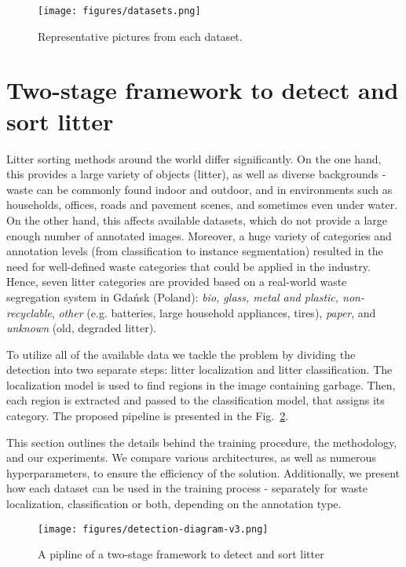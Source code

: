 \documentclass{article}
\begin{document}
\begin{figure}[!hbt]
\centering
  \texttt{[image: figures/datasets.png]}\caption{Representative pictures from each dataset. \label{fig.dataset_representants}}
\end{figure} 
\section{Two-stage framework to detect and sort litter}
\label{sec:our_approach}
Litter sorting methods around the world differ significantly. On the one hand, this provides a large variety of objects (litter), as well as diverse backgrounds - waste can be commonly found indoor and outdoor, and in environments such as households, offices, roads and pavement scenes, and sometimes even under water. On the other hand, this affects available datasets, which do not provide a large enough number of annotated images. Moreover, a huge variety of categories and annotation levels (from classification to instance segmentation) resulted in the need for well-defined waste categories that could be applied in the industry. Hence, seven litter categories are provided based on a real-world waste segregation system in Gdańsk (Poland):  \textit{bio, glass, metal and plastic, non-recyclable}, \textit{other} (e.g. batteries, large household appliances, tires), \textit{paper}, and \textit{unknown} (old, degraded litter).

To utilize all of the available data we tackle the problem by dividing the detection into two separate steps: litter localization and litter classification. The localization model is used to find regions in the image containing garbage. Then, each region is extracted and passed to the classification model, that assigns its category. The proposed pipeline is presented in the Fig.~\ref{fig.idea2}.

This section outlines the details behind the training procedure, the methodology, and our experiments. We compare various architectures, as well as numerous hyperparameters, to ensure the efficiency of the solution. Additionally, we present how each dataset can be used in the training process - separately for waste localization, classification or both, depending on the annotation type.

\begin{figure}[!ht]
\centering
  \texttt{[image: figures/detection-diagram-v3.png]}\caption{A pipline of a two-stage framework to detect and sort litter\label{fig.idea2}}
\end{figure}
\end{document}
